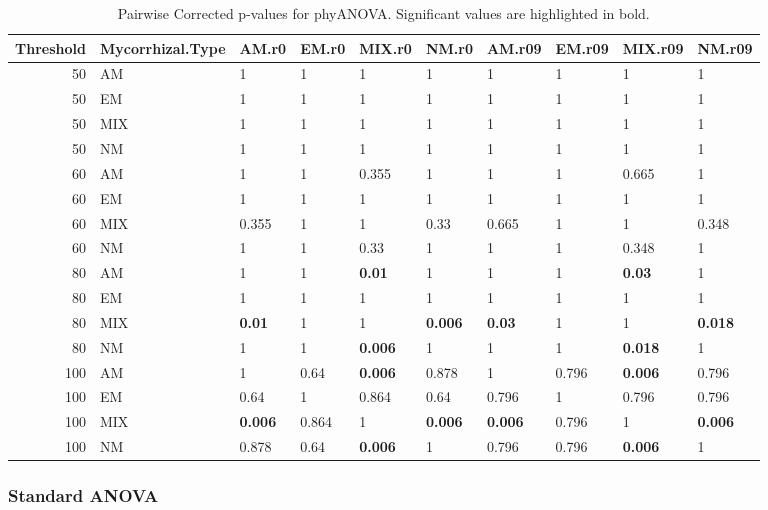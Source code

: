 \documentclass[]{article}
\begin{document}
\begin{table}[H]

\caption{\label{tab:unnamed-chunk-19}Pairwise Corrected p-values for phyANOVA. Significant values are highlighted in bold.}
\centering
\begin{tabular}{r|l|l|l|l|l|l|l|l|l}
\hline
Threshold & Mycorrhizal.Type & AM.r0 & EM.r0 & MIX.r0 & NM.r0 & AM.r09 & EM.r09 & MIX.r09 & NM.r09\\
\hline
50 & AM & 1 & 1 & 1 & 1 & 1 & 1 & 1 & 1\\
\hline
50 & EM & 1 & 1 & 1 & 1 & 1 & 1 & 1 & 1\\
\hline
50 & MIX & 1 & 1 & 1 & 1 & 1 & 1 & 1 & 1\\
\hline
50 & NM & 1 & 1 & 1 & 1 & 1 & 1 & 1 & 1\\
\hline
60 & AM & 1 & 1 & 0.355 & 1 & 1 & 1 & 0.665 & 1\\
\hline
60 & EM & 1 & 1 & 1 & 1 & 1 & 1 & 1 & 1\\
\hline
60 & MIX & 0.355 & 1 & 1 & 0.33 & 0.665 & 1 & 1 & 0.348\\
\hline
60 & NM & 1 & 1 & 0.33 & 1 & 1 & 1 & 0.348 & 1\\
\hline
80 & AM & 1 & 1 & \textbf{0.01} & 1 & 1 & 1 & \textbf{0.03} & 1\\
\hline
80 & EM & 1 & 1 & 1 & 1 & 1 & 1 & 1 & 1\\
\hline
80 & MIX & \textbf{0.01} & 1 & 1 & \textbf{0.006} & \textbf{0.03} & 1 & 1 & \textbf{0.018}\\
\hline
80 & NM & 1 & 1 & \textbf{0.006} & 1 & 1 & 1 & \textbf{0.018} & 1\\
\hline
100 & AM & 1 & 0.64 & \textbf{0.006} & 0.878 & 1 & 0.796 & \textbf{0.006} & 0.796\\
\hline
100 & EM & 0.64 & 1 & 0.864 & 0.64 & 0.796 & 1 & 0.796 & 0.796\\
\hline
100 & MIX & \textbf{0.006} & 0.864 & 1 & \textbf{0.006} & \textbf{0.006} & 0.796 & 1 & \textbf{0.006}\\
\hline
100 & NM & 0.878 & 0.64 & \textbf{0.006} & 1 & 0.796 & 0.796 & \textbf{0.006} & 1\\
\hline
\end{tabular}
\end{table}

\hypertarget{standard-anova-3}{%
\subsubsection{Standard ANOVA}\label{standard-anova-3}}
\end{document}
